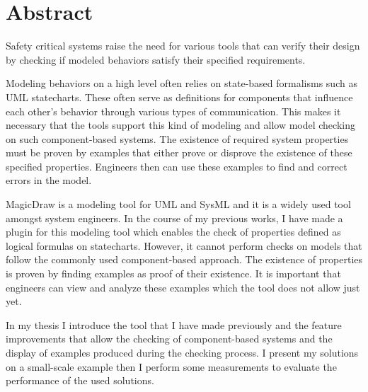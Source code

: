 \chapter*{Abstract}

Safety critical systems raise the need for various tools that can verify their design by checking if modeled behaviors satisfy their specified requirements.

Modeling behaviors on a high level often relies on state-based formalisms such as UML statecharts. These often serve as definitions for components that influence each other’s behavior through various types of communication. This makes it necessary that the tools support this kind of modeling and allow model checking on such component-based systems. The existence of required system properties must be proven by examples that either prove or disprove the existence of these specified properties. Engineers then can use these examples to find and correct errors in the model.

MagicDraw is a modeling tool for UML and SysML and it is a widely used tool amongst system engineers. In the course of my previous works, I have made a plugin for this modeling tool which enables the check of properties defined as logical formulas on statecharts. However, it cannot perform checks on models that follow the commonly used component-based approach. The existence of properties is proven by finding examples as proof of their existence. It is important that engineers can view and analyze these examples which the tool does not allow just yet.

In my thesis I introduce the tool that I have made previously and the feature improvements that allow the checking of component-based systems and the display of examples produced during the checking process. I present my solutions on a small-scale example then I perform some measurements to evaluate the performance of the used solutions.


\vfill
\cleardoublepage

\selectthesislanguage

\setcounter{romanPage}{\value{page}}
